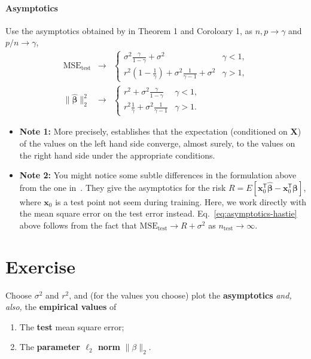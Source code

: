 \documentclass[a4paper,10pt]{article}
\newcommand{\trnsp}{\mathsf{T}}
\newenvironment{note}
{
\begin{center}
\begin{lrbox}{\mybox}
\begin{minipage}{42em}}
{\end{minipage}
\end{lrbox}\fbox{\usebox{\mybox}}
\end{center}}
\begin{document}
    \paragraph{Asymptotics} Use the asymptotics obtained by \citet{hastie_surprises_2019} in Theorem 1 and Coroloary 1, as $n, p\rightarrow \gamma$ and $p / n\rightarrow \gamma$,
    \begin{eqnarray}
        \label{eq:asymptotics-hastie}
        \text{MSE}_{\text{test}}  &\rightarrow&
        \begin{cases}
        \sigma^2 \frac{\gamma}{1 - \gamma} + \sigma^2& \gamma < 1, \\
        r^2 (1 - \frac{1}{\gamma}) + \sigma^2 \frac{1}{\gamma - 1}+ \sigma^2 & \gamma > 1,
        \end{cases}\\
        \|\hat{\boldsymbol{\beta}}\|_2^2 &\rightarrow&
        \begin{cases}
        r^2 + \sigma^2 \frac{\gamma}{1 - \gamma} & \gamma < 1, \\
        r^2 \frac{1}{\gamma} + \sigma^2 \frac{1}{\gamma - 1} &  \gamma > 1.
        \end{cases}
    \end{eqnarray}
    \begin{note}
    \begin{itemize}
    \item \textbf{Note 1:}
    More precisely, \citet{hastie_surprises_2019} establishes that the expectation (conditioned on $\textbf{X}$) of the values on the left hand side converge, almost surely, to the values on the right hand side  under the appropriate conditions.
    \item \textbf{Note 2:}
    You might notice some subtle differences in the formulation above from the one in~\citet{hastie_surprises_2019}. They give the asymptotics for the risk $R = E[\textbf{x}_0^\trnsp\hat{\boldsymbol{\beta}} -  \textbf{x}_0^\trnsp\boldsymbol{\beta}]$, where $\textbf{x}_0$ is a test point not seem during training. Here, we work directly with the mean square error on the test error instead.  Eq.~\ref{eq:asymptotics-hastie} above follows from the fact that $\text{MSE}_{\text{test}}\rightarrow R + \sigma^2$ as $n_{\text{test}} \rightarrow \infty$.
    \end{itemize}
    \end{note}
\section*{Exercise}
Choose $\sigma^2$ and $r^2$, and  (for the values you choose) plot the \textbf{asymptotics} \textit{and, also,} the \textbf{empirical values} of
\begin{enumerate}
    \item The \textbf{test} mean square error;
    \item  The \textbf{parameter $\ell_2$ norm} $\|\beta\|_2$.
\end{enumerate}
\end{document}
